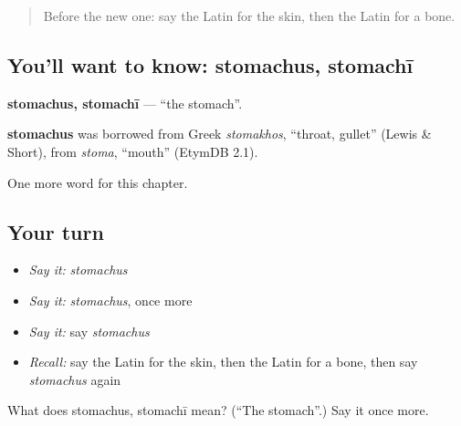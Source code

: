 \label{lesson:LA-C136-stomachus}



\begin{quote}
Before the new one: say the Latin for the skin, then the Latin for a bone.
\end{quote}

\subsection*{You'll want to know: stomachus, stomachī}
\textbf{stomachus, stomachī} — \textquotedblleft{}the stomach\textquotedblright{}.

\begin{cousinweb}
\textbf{stomachus} was borrowed from Greek \emph{stomakhos}, \textquotedblleft{}throat, gullet\textquotedblright{} (Lewis \& Short), from \emph{stoma}, \textquotedblleft{}mouth\textquotedblright{} (EtymDB 2.1).
\end{cousinweb}

\begin{grammarlens}[title={What you've built}]
One more word for this chapter.
\end{grammarlens}

\subsection*{Your turn}
\begin{itemize}
\raggedright
  \item \emph{Say it:} \emph{stomachus}
  \item \emph{Say it:} \emph{stomachus}, once more
  \item \emph{Say it:} say \emph{stomachus}
  \item \emph{Recall:} say the Latin for the skin, then the Latin for a bone, then say \emph{stomachus} again
\end{itemize}

\begin{tcolorbox}[breakable,colback=teal!4,colframe=teal!35!black,title={Before you move on}]
What does stomachus, stomachī mean? (\textquotedblleft{}The stomach\textquotedblright{}.) Say it once more.
\end{tcolorbox}
